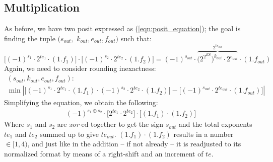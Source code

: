 \subsection{Multiplication}\label{Multiplication}

As before, we have two posit expressed as (\eqref{eqn:posit_equation}); the goal is finding the tuple $(s_{out},$ $k_{out}, e_{out}, f_{out})$ such that:
\begin{equation}\label{equ:multiplication_equation_001}
    \big[ (-1)^{s_1} \cdot 2^{te_1} \cdot (1.f_1) \big] \cdot \big[ (-1)^{s_2} \cdot 2^{te_2} \cdot (1.f_2) \big] =(-1)^{s_{out}} \cdot \overbrace{\big(2^{2^{ES}}\big)^{k_{out}} \cdot 2^{e_{out}}}^{2^{te_{out}}} \cdot (1.f_{out})
\end{equation}
Again, we need to consider rounding inexactness:
\begin{equation}
\begin{gathered}
    (s_{out}, k_{out}, e_{out}, f_{out}): \\
    \min \left| \big[ (-1)^{s_1} \cdot 2^{te_1} \cdot (1.f_1) \cdot (-1)^{s_2} \cdot 2^{te_2} \cdot (1.f_2) \big] - \big[ (-1)^{s_{out}} \cdot 2^{te_{out}} \cdot (1.f_{out}) \big] \right|
\end{gathered}
\end{equation}
Simplifying the equation, we obtain the following:
\begin{equation}
\begin{gathered}
    (-1)^{s_1 \oplus s_2}  \cdot \big[ 2^{te_1} \cdot 2^{te_2} \big] \cdot \big[ (1.f_1) \cdot (1.f_2) \big]
\end{gathered}
\end{equation}
Where $s_1$ and $s_2$ are \textit{xor}-ed together to get the sign $s_{out}$ and the total exponents $te_1$ and $te_2$ summed up to give $te_{out}$. 
$(1.f_1) \cdot (1.f_2)$ results in a number $\in [1, 4)$, and just like in the addition -- if not already -- it is readjusted to its normalized format by means of a right-shift and an increment of $te$.
